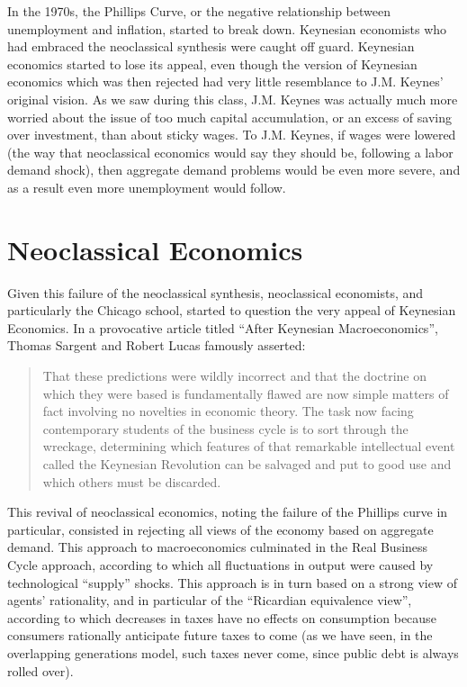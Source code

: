 \documentclass[]{book}
\begin{document}
In the 1970s, the Phillips Curve, or the negative relationship between
unemployment and inflation, started to break down. Keynesian economists
who had embraced the neoclassical synthesis were caught off guard.
Keynesian economics started to lose its appeal, even though the version
of Keynesian economics which was then rejected had very little
resemblance to J.M. Keynes' original vision. As we saw during this
class, J.M. Keynes was actually much more worried about the issue of too
much capital accumulation, or an excess of saving over investment, than
about sticky wages. To J.M. Keynes, if wages were lowered (the way that
neoclassical economics would say they should be, following a labor
demand shock), then aggregate demand problems would be even more severe,
and as a result even more unemployment would follow.

\section{Neoclassical Economics}\label{neoclassical-economics}

Given this failure of the neoclassical synthesis, neoclassical
economists, and particularly the Chicago school, started to question the
very appeal of Keynesian Economics. In a provocative article titled
``After Keynesian Macroeconomics'', Thomas Sargent and Robert Lucas
famously asserted:

\begin{quote}
That these predictions were wildly incorrect and that the doctrine on
which they were based is fundamentally flawed are now simple matters of
fact involving no novelties in economic theory. The task now facing
contemporary students of the business cycle is to sort through the
wreckage, determining which features of that remarkable intellectual
event called the Keynesian Revolution can be salvaged and put to good
use and which others must be discarded.
\end{quote}

This revival of neoclassical economics, noting the failure of the
Phillips curve in particular, consisted in rejecting all views of the
economy based on aggregate demand. This approach to macroeconomics
culminated in the Real Business Cycle approach, according to which all
fluctuations in output were caused by technological ``supply'' shocks.
This approach is in turn based on a strong view of agents' rationality,
and in particular of the ``Ricardian equivalence view'', according to
which decreases in taxes have no effects on consumption because
consumers rationally anticipate future taxes to come (as we have seen,
in the overlapping generations model, such taxes never come, since
public debt is always rolled over).
\end{document}
